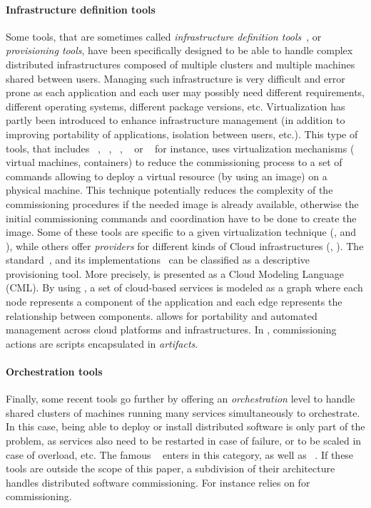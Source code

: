 \paragraph{Infrastructure definition tools}
Some tools, that are sometimes called \emph{infrastructure definition
  tools}~\cite{}, or \emph{provisioning tools}, have been specifically
designed to be able to handle complex distributed infrastructures
composed of multiple clusters and multiple machines shared between
users. Managing such infrastructure is very difficult and error prone
as each application and each user may possibly need different
requirements, different operating systems, different package versions,
etc. Virtualization has partly been introduced to enhance
infrastructure management (in addition to improving portability of
applications, isolation between users, etc.). This type of tools, that
includes \docker~\cite{docker:web}, \terraform~\cite{terraform:web},
\juju~\cite{juju:web}, \cloudformation~\cite{cloudf:web} or
\heat~\cite{heat:web} for instance, uses virtualization mechanisms (\eg
virtual machines, containers) to reduce the commissioning process to a
set of commands allowing to deploy a virtual resource (by using an image) on a
physical machine. This technique potentially reduces the complexity of
the commissioning procedures if the needed image is already available,
otherwise the initial commissioning commands and coordination have to
be done to create the image. Some of these tools are specific to a
given virtualization technique (\eg \docker, \cloudformation and
\heat), while others offer \emph{providers} for different kinds of
Cloud infrastructures (\eg \terraform, \juju). The \tosca
standard~\cite{tosca:web}, and its
implementations~\cite{Binz2013,cloudify:web,opentosca:web,8599581} can
be classified as a descriptive provisioning tool. More precisely,
\tosca is presented as a Cloud Modeling Language (CML). By using
\tosca, a set of cloud-based services is modeled as a graph where each
node represents a component of the application and each edge
represents the relationship between components. \tosca allows for
portability and automated management across cloud platforms and
infrastructures. In \tosca, commissioning actions are scripts
encapsulated in \emph{artifacts}.

\paragraph{Orchestration tools}
Finally, some recent tools go further by offering an
\emph{orchestration} level to handle shared clusters of machines
running many services simultaneously to orchestrate. In this case,
being able to deploy or install distributed software is only part of
the problem, as services also need to be restarted in case of failure, or
to be scaled in case of overload, etc. The famous
\kubernetes~\cite{kubernetes:web} enters in this category, as well as
\dockerswarm~\cite{dockerswarm:web}. If these tools are outside the
scope of this paper, a subdivision of their architecture handles
distributed software commissioning. For instance \kubernetes relies
on \docker for commissioning.

